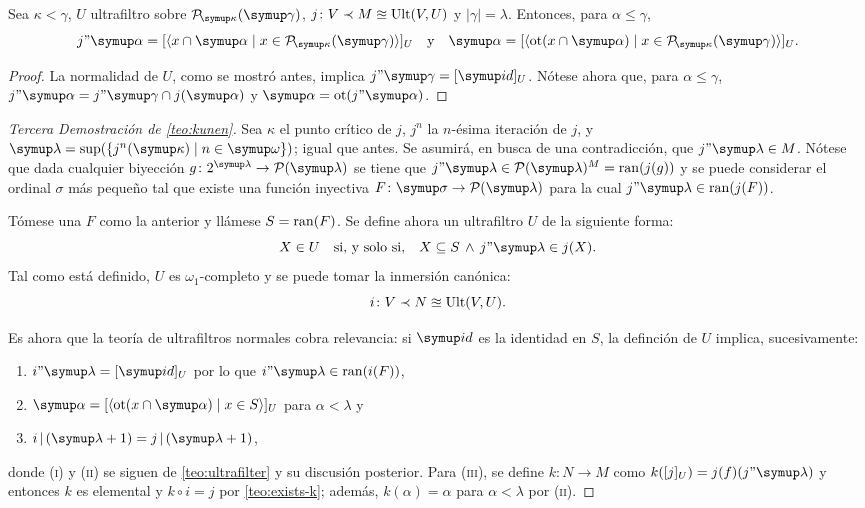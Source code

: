 \documentclass
[
  12pt,
  letterpaper,
  openany,
  oneside,
]{book}
\begin{document}
\begin{teo}\label{teo:ultrafilter}
    Sea $\kappa<\gamma$, $U$ ultrafiltro sobre $\pwset[\kappa]{\gamma}$,
    $j\colon V\prec M\approxeq\operatorname{Ult}(V, U)$ y $|\gamma|=\lambda$. Entonces,
    para $\alpha\leq\gamma$,
    \[
        j"\alpha=[\seq{x\cap \alpha\mid x\in\pwset[\kappa]{\gamma}}]_U
        \quad\text{y}\quad
        \alpha = [\seq{\ot(x\cap \alpha)\mid x\in\pwset[\kappa]{\gamma}}]_U.
    \]
\end{teo}

\begin{proof}
La normalidad de $U$, como se mostró antes, implica $j"\gamma = [\id]_U$.
Nótese ahora que, para $\alpha\leq\gamma$, $j"\alpha=j"\gamma\cap j(\alpha)$
y $\alpha=\ot(j"\alpha)$.
\end{proof}

\begin{proof}[Tercera Demostración de \ref{teo:kunen}]
    \bgroup\sloppy
    Sea $\kappa$ el punto crítico de $j$, $j^n$ la $n$-ésima iteración de $j$,
    y $\lambda=\sup(\set{j^n(\kappa)\mid n\in\omega})$; igual que antes.
    Se asumirá, en busca de una contradicción, que $j"\lambda\in M$.
    Nótese que dada cualquier biyección $g\colon 2^\lambda\to\pwset{\lambda}$ se tiene que
    $j"\lambda\in\pwset{\lambda}^M = \ran(j(g))$ y se puede considerar el ordinal $\sigma$ más
    pequeño tal que existe una función inyectiva $F\colon\sigma\to\pwset{\lambda}$ para la cual
    $j"\lambda\in \ran(j(F))$.\par
    \egroup

    Tómese una $F$ como la anterior y llámese $S=\operatorname{ran}(F)$.
    Se define ahora un ultrafiltro $U$ de la siguiente forma:
    \[
        X\in U\quad\text{si, y solo si,}\quad X\subseteq S \,\land\, j"\lambda\in j(X).
    \]
    Tal como está definido, $U$ es $\omega_1$-completo y se puede tomar la inmersión canónica:
    \[
        i\colon V\prec N\approxeq\operatorname{Ult}(V, U).
    \]

    Es ahora que la teoría de ultrafiltros normales cobra relevancia: si $\id$
    es la identidad en $S$, la definción de $U$ implica, sucesivamente:
    \begin{enumerate}[label=(\roman*)]
        \item $i"\lambda = [\id]_U$ por lo que $i"\lambda\in\ran(i(F))$,
        \item $\alpha = [\seq{\ot(x\cap\alpha)\mid x\in S}]_U$ para $\alpha<\lambda$ y
        \item $i\rest(\lambda+1) = j\rest(\lambda+1)$,
    \end{enumerate}
    donde (\textsc{i}) y (\textsc{ii}) se siguen de \ref{teo:ultrafilter} y su discusión
    posterior. Para (\textsc{iii}), se define $k\colon N\to M$ como
    $k([j]_U) = j(f)(j"\lambda)$ y entonces $k$ es elemental y $k\circ i = j$
    por \ref{teo:exists-k}; además, $k(\alpha)=\alpha$ para $\alpha<\lambda$ por
    (\textsc{ii}).


\end{proof}
\end{document}
